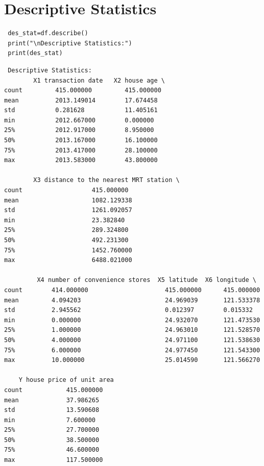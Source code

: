 \section{Descriptive Statistics}
\vspace{-.6cm}
\begin{code}
\begin{lstlisting}
 des_stat=df.describe()
 print("\nDescriptive Statistics:")
 print(des_stat)
\end{lstlisting}
\end{code}
\vspace{-.75cm}
\begin{verbatim}
 Descriptive Statistics:
        X1 transaction date   X2 house age \
count         415.000000         415.000000
mean          2013.149014        17.674458
std           0.281628           11.405161
min           2012.667000        0.000000
25%           2012.917000        8.950000
50%           2013.167000        16.100000
75%           2013.417000        28.100000
max           2013.583000        43.800000

        X3 distance to the nearest MRT station \
count                   415.000000
mean                    1082.129338
std                     1261.092057
min                     23.382840
25%                     289.324800
50%                     492.231300
75%                     1452.760000
max                     6488.021000

         X4 number of convenience stores  X5 latitude  X6 longitude \
count        414.000000                     415.000000      415.000000
mean         4.094203                       24.969039       121.533378
std          2.945562                       0.012397        0.015332
min          0.000000                       24.932070       121.473530
25%          1.000000                       24.963010       121.528570
50%          4.000000                       24.971100       121.538630
75%          6.000000                       24.977450       121.543300
max          10.000000                      25.014590       121.566270

    Y house price of unit area
count            415.000000
mean             37.986265
std              13.590608
min              7.600000
25%              27.700000
50%              38.500000  
75%              46.600000
max              117.500000
\end{verbatim}
\vspace{-.75cm}
